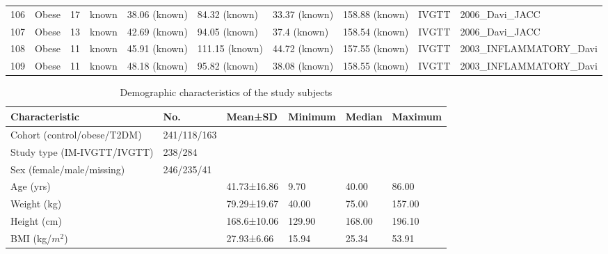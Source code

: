 \documentclass[utf8]{frontiersSCNS} %
\begin{document}
\begin{table}[h]
{\begin{tabular}{llllllllll}
106 & Obese   & 17 & known             & 38.06 (known)      & 84.32 (known)  & 33.37 (known)      & 158.88 (known)      & IVGTT    & 2006\_Davi\_JACC           \\
107 & Obese   & 13 & known             & 42.69 (known)      & 94.05 (known)  & 37.4 (known)       & 158.54 (known)      & IVGTT    & 2006\_Davi\_JACC           \\
108 & Obese   & 11 & known             & 45.91 (known)      & 111.15 (known) & 44.72 (known)      & 157.55 (known)      & IVGTT    & 2003\_INFLAMMATORY\_Davi   \\
109 & Obese   & 11 & known             & 48.18 (known)      & 95.82 (known)  & 38.08 (known)      & 158.55 (known)      & IVGTT    & 2003\_INFLAMMATORY\_Davi  \\  \hline
\end{tabular}}
\end{table}

\begin{table}[h]
\caption{Demographic characteristics of the study subjects}
\label{tab:demo}
\begin{tabular}{llllll}
\hline
Characteristic                & No.         & Mean±SD     & Minimum & Median & Maximum \\ \hline
Cohort (control/obese/T2DM)   & 241/118/163 &             &         &        &         \\
Study type (IM-IVGTT/IVGTT)   & 238/284     &             &         &        &         \\
Sex (female/male/missing)     & 246/235/41  &             &         &        &         \\
Age (yrs)                     &             & 41.73±16.86 & 9.70    & 40.00  & 86.00   \\
Weight (kg)                   &             & 79.29±19.67 & 40.00   & 75.00  & 157.00  \\
Height (cm)                   &             & 168.6±10.06 & 129.90  & 168.00 & 196.10  \\
BMI (kg/$m^2$) &             & 27.93±6.66  & 15.94   & 25.34  & 53.91  \\ \hline
\end{tabular}
\end{table}
\end{document}
